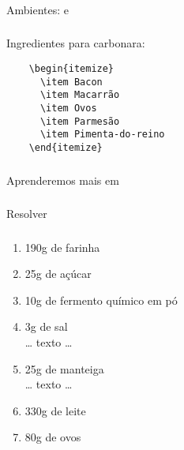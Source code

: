 \begin{frame}[standout]
  \Huge
\end{frame}

\begin{frame}
  \frametitle{}
  \Huge
  Ambientes:  e 
\end{frame}

\begin{frame}[fragile]
  \frametitle{}
  \LARGE
  Ingredientes para carbonara:

  \begin{verbatim}
    \begin{itemize}
      \item Bacon
      \item Macarrão
      \item Ovos
      \item Parmesão
      \item Pimenta-do-reino
    \end{itemize}
  \end{verbatim}
\end{frame}

\begin{frame}
  \frametitle{}
  \Huge
  Aprenderemos mais em 
\end{frame}

\begin{frame}
  \frametitle{}
  \Huge
  Resolver 
\end{frame}

\begin{frame}
  \frametitle{}
  \large
  \begin{enumerate}[{Ingrediente} 1)]
    \item 190g de farinha
    \item 25g de açúcar
    \item 10g de fermento químico em pó
    \item 3g de sal\\[1em] … texto …\\
    \item 25g de manteiga\\[1em] … texto …\\
    \item 330g de leite
    \item 80g de ovos
  \end{enumerate}
\end{frame}
